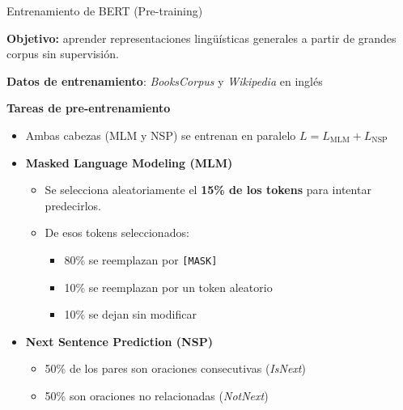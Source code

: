 \begin{frame}{Entrenamiento de BERT (Pre-training)}

\textbf{Objetivo:} aprender representaciones lingüísticas generales a partir de grandes corpus sin supervisión.

\textbf{Datos de entrenamiento}: \textit{BooksCorpus} y \textit{Wikipedia} en inglés

\textbf{Tareas de pre-entrenamiento}
\begin{itemize}
    \item Ambas cabezas (MLM y NSP) se entrenan en paralelo $L = L_{\text{MLM}} + L_{\text{NSP}}$

    \item \textbf{Masked Language Modeling (MLM)}  
    \begin{itemize}
        \item Se selecciona aleatoriamente el \textbf{15\% de los tokens} para intentar predecirlos.
        \item De esos tokens seleccionados:
        \begin{itemize}
            \item 80\% se reemplazan por \texttt{[MASK]}
            \item 10\% se reemplazan por un token aleatorio
            \item 10\% se dejan sin modificar
        \end{itemize}
    \end{itemize}
    \item \textbf{Next Sentence Prediction (NSP)}  
    \begin{itemize}
        \item 50\% de los pares son oraciones consecutivas (\textit{IsNext})
        \item 50\% son oraciones no relacionadas (\textit{NotNext})
    \end{itemize}
\end{itemize}

\end{frame}



